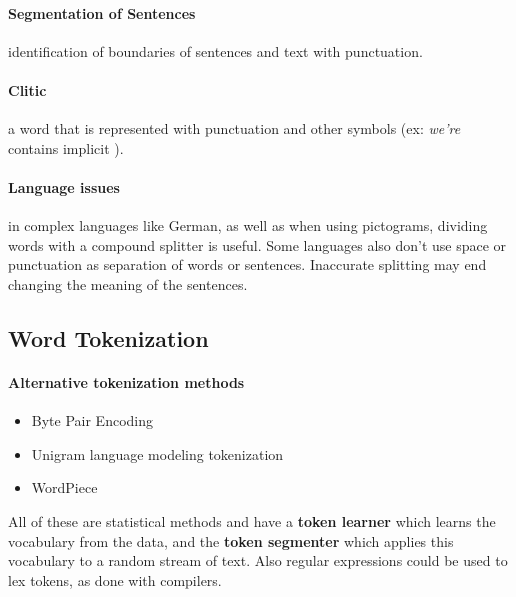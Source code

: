\paragraph{Segmentation of Sentences} identification of boundaries of sentences and text with punctuation.

\paragraph{Clitic} a word that is represented with punctuation and other symbols (ex: \textit{we're} contains implicit ).

\paragraph{Language issues} in complex languages like German, as well as when using pictograms, dividing words with a compound splitter is useful.
Some languages also don't use space or punctuation as separation of words or sentences. Inaccurate splitting may end changing the meaning of the sentences.

\subsection{Word Tokenization}

\paragraph{Alternative tokenization methods}
\begin{itemize}
  \item Byte Pair Encoding
  \item Unigram language modeling tokenization
  \item WordPiece
\end{itemize}

All of these are statistical methods and have a \textbf{token learner} which learns the vocabulary from the data, and the \textbf{token segmenter} which applies this vocabulary to a random stream of text.
Also regular expressions could be used to lex tokens, as done with compilers.
